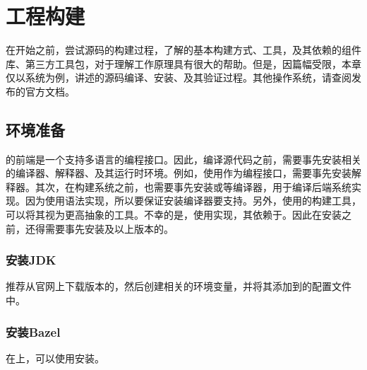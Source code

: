 \section{工程构建}

\begin{content}

在开始之前，尝试\tf{}源码的构建过程，了解\tf{}的基本构建方式、工具，及其依赖的组件库、第三方工具包，对于理解\tf{}工作原理具有很大的帮助。但是，因篇幅受限，本章仅以系统为例，讲述\tf{}的源码编译、安装、及其验证过程。其他操作系统，请查阅\tf{}发布的官方文档。

\subsection{环境准备}

的前端是一个支持多语言的编程接口。因此，编译源代码之前，需要事先安装相关的编译器、解释器、及其运行时环境。例如，使用作为编程接口，需要事先安装解释器。其次，在构建系统之前，也需要事先安装或等编译器，用于编译后端系统实现。因为使用语法实现，所以要保证安装编译器要支持。另外，使用的构建工具，可以将其视为更高抽象的工具。不幸的是，使用实现，其依赖于。因此在安装之前，还得需要事先安装及以上版本的。

\subsubsection{安装JDK}

推荐从官网上下载版本的，然后创建相关的环境变量，并将其添加到的配置文件中。

\begin{leftbar}
\end{leftbar}

\subsubsection{安装Bazel}

在上，可以使用安装。


\end{content}
